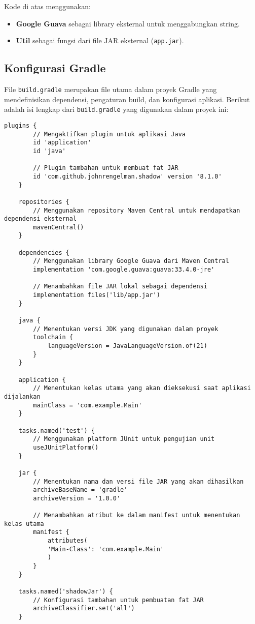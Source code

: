 Kode di atas menggunakan:
\begin{itemize}
	\item \textbf{Google Guava} sebagai library eksternal untuk menggabungkan string.
	\item \textbf{Util} sebagai fungsi dari file JAR eksternal (\texttt{app.jar}).
\end{itemize}

\subsection{Konfigurasi Gradle}
File \texttt{build.gradle} merupakan file utama dalam proyek Gradle yang mendefinisikan dependensi, pengaturan build, dan konfigurasi aplikasi. Berikut adalah isi lengkap dari \texttt{build.gradle} yang digunakan dalam proyek ini:

\begin{lstlisting}[style=JavaStyle]
	plugins {
		// Mengaktifkan plugin untuk aplikasi Java
		id 'application'
		id 'java'
		
		// Plugin tambahan untuk membuat fat JAR
		id 'com.github.johnrengelman.shadow' version '8.1.0'
	}
	
	repositories {
		// Menggunakan repository Maven Central untuk mendapatkan dependensi eksternal
		mavenCentral()
	}
	
	dependencies {
		// Menggunakan library Google Guava dari Maven Central
		implementation 'com.google.guava:guava:33.4.0-jre'
		
		// Menambahkan file JAR lokal sebagai dependensi
		implementation files('lib/app.jar')
	}
	
	java {
		// Menentukan versi JDK yang digunakan dalam proyek
		toolchain {
			languageVersion = JavaLanguageVersion.of(21)
		}
	}
	
	application {
		// Menentukan kelas utama yang akan dieksekusi saat aplikasi dijalankan
		mainClass = 'com.example.Main'
	}
	
	tasks.named('test') {
		// Menggunakan platform JUnit untuk pengujian unit
		useJUnitPlatform()
	}
	
	jar {
		// Menentukan nama dan versi file JAR yang akan dihasilkan
		archiveBaseName = 'gradle'
		archiveVersion = '1.0.0'
		
		// Menambahkan atribut ke dalam manifest untuk menentukan kelas utama
		manifest {
			attributes(
			'Main-Class': 'com.example.Main'
			)
		}
	}
	
	tasks.named('shadowJar') {
		// Konfigurasi tambahan untuk pembuatan fat JAR
		archiveClassifier.set('all')
	}
\end{lstlisting}

